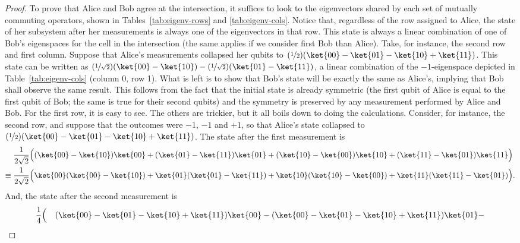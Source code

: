 \documentclass{llncs}
\begin{document}
\begin{proof}
  To prove that Alice and Bob agree at the intersection, it suffices
  to look to the eigenvectors shared by each set of mutually commuting
  operators, shown in Tables~\ref{tab:eigenv-rows} and
  \ref{tab:eigenv-cols}.  Notice that, regardless of the row assigned
  to Alice, the state of her subsystem after her measurements is
  always one of the eigenvectors in that row. This state is always a
  linear combination of one of Bob's eigenspaces for the cell in the
  intersection (the same applies if we consider first Bob than Alice).
  Take, for instance, the second row and first column. Suppose that
  Alice's measurements collapsed her qubits to
  \((\nicefrac{1}{2}) (\ket{00} - \ket{01} - \ket{10} + \ket{11})\).
  This state can be written as
  \((\nicefrac{1}{\sqrt{2}}) (\ket{00} - \ket{10}) -
  (\nicefrac{1}{\sqrt{2}}) (\ket{01} - \ket{11})\), a linear
  combination of the \(-1\)-eigenspace depicted in
  Table~\ref{tab:eigenv-cols} (column 0, row 1).  What is left is to
  show that Bob's state will be exactly the same as Alice's, implying
  that Bob shall observe the same result. This follows from the fact
  that the initial state is already symmetric (the first qubit of
  Alice is equal to the first qubit of Bob; the same is true for their
  second qubits) and the symmetry is preserved by any measurement
  performed by Alice and Bob. For the first row, it is easy to see.
  The others are trickier, but it all boils down to doing the
  calculations.  Consider, for instance, the second row, and suppose
  that the outcomes were \(-1\), \(-1\) and \(+1\), so that Alice's
  state collapsed to
  \((\nicefrac{1}{2}) (\ket{00} - \ket{01} - \ket{10} +
  \ket{11})\). The state after the first measurement is
  \begin{align}
    &\frac{1}{2\sqrt{2}} \Bigl(
    (\ket{00} - \ket{10}) \ket{00} +
    (\ket{01} - \ket{11}) \ket{01} +
    (\ket{10} - \ket{00}) \ket{10} +
    (\ket{11} - \ket{01}) \ket{11}
    \Bigr) \nonumber \\
    \equiv\;
    & \frac{1}{2\sqrt{2}} \Bigl(
      \ket{00} (\ket{00} - \ket{10}) +
      \ket{01} (\ket{01} - \ket{11}) +
      \ket{10} (\ket{10} - \ket{00}) +
      \ket{11} (\ket{11} - \ket{01})
    \Bigr).
  \end{align}
  And, the state after the second measurement is
  \begin{alignat}{2}
    &\frac{1}{4} \Bigl(
      &&(\ket{00} - \ket{01} - \ket{10} + \ket{11}) \ket{00} -
        (\ket{00} - \ket{01} - \ket{10} + \ket{11}) \ket{01} - \nonumber \\

\end{alignat}
\end{proof}
\end{document}
